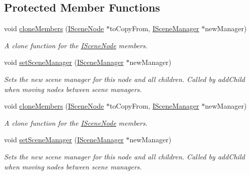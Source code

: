 \subsection*{Protected Member Functions}
\begin{DoxyCompactItemize}
\item 
void \hyperlink{classirr_1_1scene_1_1ISceneNode_a00a4ef0212b5d4b005202519859689bd}{clone\+Members} (\hyperlink{classirr_1_1scene_1_1ISceneNode}{I\+Scene\+Node} $\ast$to\+Copy\+From, \hyperlink{classirr_1_1scene_1_1ISceneManager}{I\+Scene\+Manager} $\ast$new\+Manager)
\begin{DoxyCompactList}\small\item\em A clone function for the \hyperlink{classirr_1_1scene_1_1ISceneNode}{I\+Scene\+Node} members. \end{DoxyCompactList}\item 
\mbox{\label{classirr_1_1scene_1_1ISceneNode_a513d09ae37f71391d7c4838e29164a3e}} 
void \hyperlink{classirr_1_1scene_1_1ISceneNode_a513d09ae37f71391d7c4838e29164a3e}{set\+Scene\+Manager} (\hyperlink{classirr_1_1scene_1_1ISceneManager}{I\+Scene\+Manager} $\ast$new\+Manager)
\begin{DoxyCompactList}\small\item\em Sets the new scene manager for this node and all children. Called by add\+Child when moving nodes between scene managers. \end{DoxyCompactList}\item 
void \hyperlink{classirr_1_1scene_1_1ISceneNode_a00a4ef0212b5d4b005202519859689bd}{clone\+Members} (\hyperlink{classirr_1_1scene_1_1ISceneNode}{I\+Scene\+Node} $\ast$to\+Copy\+From, \hyperlink{classirr_1_1scene_1_1ISceneManager}{I\+Scene\+Manager} $\ast$new\+Manager)
\begin{DoxyCompactList}\small\item\em A clone function for the \hyperlink{classirr_1_1scene_1_1ISceneNode}{I\+Scene\+Node} members. \end{DoxyCompactList}\item 
\mbox{\label{classirr_1_1scene_1_1ISceneNode_a513d09ae37f71391d7c4838e29164a3e}} 
void \hyperlink{classirr_1_1scene_1_1ISceneNode_a513d09ae37f71391d7c4838e29164a3e}{set\+Scene\+Manager} (\hyperlink{classirr_1_1scene_1_1ISceneManager}{I\+Scene\+Manager} $\ast$new\+Manager)
\begin{DoxyCompactList}\small\item\em Sets the new scene manager for this node and all children. Called by add\+Child when moving nodes between scene managers. \end{DoxyCompactList}\end{DoxyCompactItemize}
